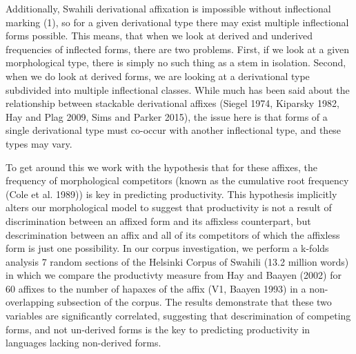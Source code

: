 \documentclass{article}\usepackage[]{graphicx}\usepackage[]{color}
\begin{document}
\par Additionally, Swahili derivational affixation is impossible without inflectional marking (1), so for a given derivational type there may exist multiple inflectional forms possible. This means, that when we look at derived and underived frequencies of inflected forms, there are two problems. First, if we look at a given morphological type, there is simply no such thing as a stem in isolation. Second, when we do look at derived forms, we are looking at a derivational type subdivided into multiple inflectional classes. While  much has been said about the relationship between stackable derivational affixes (Siegel 1974, Kiparsky 1982, Hay and Plag 2009, Sims and Parker 2015), the issue here is that forms of a single derivational type must co-occur with another inflectional type, and these types may vary.

\par To get around this we work with the hypothesis that for these affixes, the frequency of morphological competitors (known as the cumulative root frequency (Cole et al. 1989)) is key in predicting productivity. This hypothesis implicitly alters our morphological model to suggest that productivity is not a result of discrimination between an affixed form and its affixless counterpart, but descrimination between an affix and all of its competitors of which the affixless form is just one possibility.
  In our corpus investigation, we perform a k-folds analysis 7 random sections of the Helsinki Corpus of Swahili (13.2 million words) in which we compare the productivty measure from Hay and Baayen (2002) for 60 affixes to the number of hapaxes of the affix (V1, Baayen 1993) in a non-overlapping subsection of the corpus. The results demonstrate that these two variables are significantly correlated, suggesting that descrimination of competing forms, and not un-derived forms is the key to predicting productivity in languages lacking non-derived forms.
\end{document}
